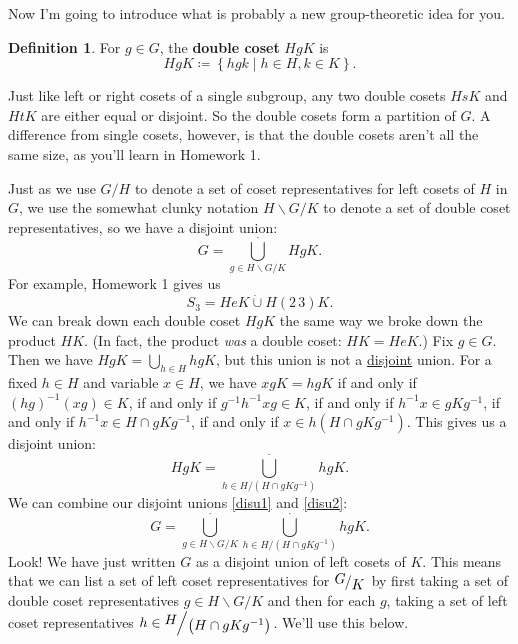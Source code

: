\documentclass[12pt]{article}
\newcommand{\ita}[1]{\textit{#1}}
\newcommand\inv[1]{#1^{-1}}
\newcommand\paren[1]{\left( #1 \right)}
\newcommand\setb[1]{\left \{ #1 \right \}}
\newcommand{\quotient}[2]{{\makebox[\width-2.3pt][l]{\raisebox{.2em}{$#1$}}\left/\raisebox{-.2em}{$#2$}\right.}}
\theoremstyle{definition}
\newtheorem{definition}[theorem]{Definition}
\begin{document}
Now I'm going to introduce what is probably a new group-theoretic idea for you.
\begin{definition}
    For $g \in G$, the \textbf{double coset} $HgK$ is 
    \begin{equation}
        HgK \coloneqq  \setb{ hgk \mid h \in H, k \in K }.
    \end{equation}
\end{definition}
Just like left or right cosets of a single subgroup, any two double cosets $HsK$ and $HtK$ are either equal or disjoint. So the double cosets form a partition of $G$. A difference from single cosets, however, is that the double cosets aren't all the same size, as you'll learn in Homework 1.

Just as we use $G/H$ to denote a set of coset representatives for left cosets of $H$ in $G$, we use the somewhat clunky notation $H\backslash G / K$ to denote a set of double coset representatives, so we have a disjoint union:
\begin{equation}\label{disu1}
    G = \bigcup\limits_{g \in H\backslash G / K}^{\cdot} HgK.
\end{equation}
For example, Homework 1 gives us 
\begin{equation}
    S_3 = HeK \dot{\cup} H (2\,3) K.
\end{equation}
We can break down each double coset $HgK$ the same way we broke down the product $HK$. (In fact, the product \ita{was} a double coset: $HK = HeK$.) Fix $g \in G$. Then we have $HgK = \bigcup\limits_{h \in H} hgK$, but this union is not a \underline{disjoint} union. For a fixed $h \in H$ and variable $x \in H$, we have $xgK = hgK$ if and only if $\inv{ \paren{ hg } }(xg) \in K$, if and only if $\inv{g} \inv{h} xg \in K$, if and only if $\inv{h}x \in gK\inv{g}$, if and only if $\inv{h}x \in H \cap gK\inv{g}$, if and only if $x \in h \paren{ H \cap gK\inv{g} }$. This gives us a disjoint union:
\begin{equation}\label{disu2}
    HgK = \bigcup\limits_{h \in H / \paren{ H \cap gK\inv{g} } }^{\cdot} hgK.
\end{equation}
We can combine our disjoint unions \eqref{disu1} and \eqref{disu2}:
\begin{equation}\label{disu3}
    G = \bigcup\limits_{g \in H \backslash G / K}^{\cdot} \bigcup\limits_{h \in H / \paren{ H \cap gK\inv{g} } }^{\cdot} hgK.
\end{equation}
Look! We have just written $G$ as a disjoint union of left cosets of $K$. This means that we can list a set of left coset representatives for $\quotient{G}{K}$ by first taking a set of double coset representatives $g \in H \backslash G / K$ and then for each $g$, taking a set of left coset representatives $h \in \quotient{H}{\paren{ H \cap gK\inv{g}}}$. We'll use this below.
\end{document}
